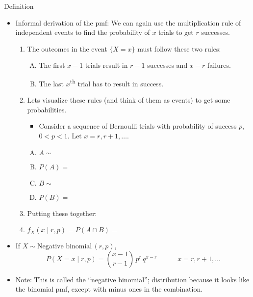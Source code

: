 \documentclass{article}
\newcommand{\follow}[1]{\sim \text{#1}\,}		%
\begin{document}
Definition\bigskip
\begin{itemize}
    \item Informal derivation of the pmf: We can again use the multiplication rule of independent events to find the probability of $x$ trials to get $r$ successes.\bigskip
    \begin{enumerate}
        \item The outcomes in the event $\{X = x\}$ must follow these two rules:
        \begin{enumerate}[A)]
            \item The first $x - 1$ trials result in $r - 1$ successes and $x - r$ failures.
            \item The last $x$\textsuperscript{th} trial has to result in success.
        \end{enumerate}\bigskip
        \item Lets visualize these rules (and think of them as events) to get some probabilities.
        \begin{itemize}
            \item Consider a sequence of Bernoulli trials with probability of success $p$,\\ $0 < p < 1$. Let $x = r, r + 1, \ldots$.\vspace{90pt}
        \end{itemize}
        \begin{enumerate}[A)]
            \item $A \sim$
            \item[] $P(A) = $\bigskip
            \item $B \sim$
            \item[] $P(B) = $\bigskip
        \end{enumerate}
        \item Putting these together:\bigskip
        \item[] $f_X(x \mid r, p) = P(A \cap B) = $\vspace{40pt}
    \end{enumerate}
    \item If $X \follow{Negative binomial}(r, p)$,
    \[P(X = x \mid r, p) = {{x - 1} \choose {r - 1}} \, p^r \, q^{x - r} \quad\quad\quad x = r, r + 1, \ldots\]
    \item Note: This is called the ``negative binomial''; distribution because it looks like the binomial pmf, except with minus ones in the combination.
\end{itemize}\bigskip
\end{document}
